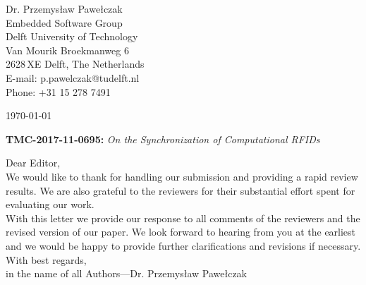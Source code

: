 \documentclass[10pt]{article}
\begin{document}
\pagestyle{myheadings}
\thispagestyle{empty}


\headsep 0.5cm

\bigskip\bigskip


\bigskip\bigskip

\begin{flushright}
Dr. Przemys{\l}aw Pawe{\l}czak \\
Embedded Software Group \\ 
Delft University of Technology \\ 
Van Mourik Broekmanweg 6\\
2628\,XE Delft, The Netherlands \\
E-mail: p.pawelczak@tudelft.nl\\
Phone: +31 15 278 7491\\
\end{flushright}

\vspace*{2cm}

\today
\medskip


\textbf{TMC-2017-11-0695:} {\sl On the Synchronization of Computational RFIDs}

\bigskip

Dear Editor,\\

We would like to thank for handling our submission and providing a rapid review results. We are also grateful to the reviewers for their substantial effort spent for evaluating our work. \\

With this letter we provide our response to all comments of the reviewers and the revised version of our paper. We look forward to hearing from you at the earliest and we would be happy to provide further clarifications and revisions if necessary. \\

With best regards, \\

in the name of all Authors---Dr. Przemys{\l}aw Pawe{\l}czak

\pagebreak
\end{document}
